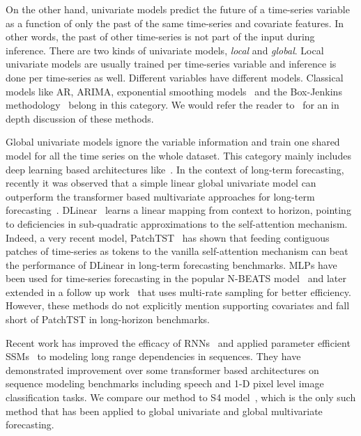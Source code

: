 \documentclass[10pt]{article} \usepackage[accepted]{tmlr}
\theoremstyle{plain}
\theoremstyle{definition}
\theoremstyle{remark}
\begin{document}
On the other hand, univariate models predict the future of a time-series variable as a function of only the past of the same time-series and covariate features. In other words, the past of other time-series is not part of the input during inference. There are two kinds of univariate models, \textit{local} and \textit{global}. Local univariate models are usually trained per time-series variable and inference is done per time-series as well. Different variables have different models. Classical models like AR, ARIMA,  exponential smoothing models~\citep{mckenzie1984general} and the Box-Jenkins methodology~\citep{box1968some} belong in this category. We would refer the reader to~\citep{box2015time} for an in depth discussion of these methods.

Global univariate models ignore the variable information and train one shared model for all the time series on the whole dataset. This category mainly includes deep learning based architectures like~\citep{salinas2020deepar}. In the context of long-term forecasting, recently it was observed that a simple linear global univariate model can outperform the transformer based multivariate approaches for long-term forecasting~\citep{zeng2022transformers}. DLinear~\citep{zeng2022transformers} learns a  linear mapping from context to horizon, pointing to deficiencies in sub-quadratic approximations to the self-attention mechanism. Indeed, a very recent model, PatchTST~\citep{nie2022time} has shown that feeding contiguous patches of time-series as tokens to the vanilla self-attention mechanism can beat the performance of DLinear in long-term forecasting benchmarks.
MLPs have been used for time-series forecasting in the popular N-BEATS model~\citep{oreshkinn} and later extended in a follow up work~\citep{challu2022nhits} that uses multi-rate sampling for better efficiency. However, these methods do not explicitly mention supporting covariates and fall short of PatchTST in long-horizon benchmarks.

Recent work has improved the efficacy of RNNs~\citep{kag2020rnns, lukovsevivcius2022time, rusch2020coupled, li2019deep} and applied parameter efficient SSMs~\citep{guefficiently, gupta2022diagonal} to modeling long range dependencies in sequences. They have demonstrated improvement over some transformer based architectures on sequence modeling benchmarks including speech and 1-D pixel level image classification tasks. We compare our method to S4 model~\citep{guefficiently}, which is the only such method that has been applied to global univariate and global multivariate forecasting.
\end{document}
